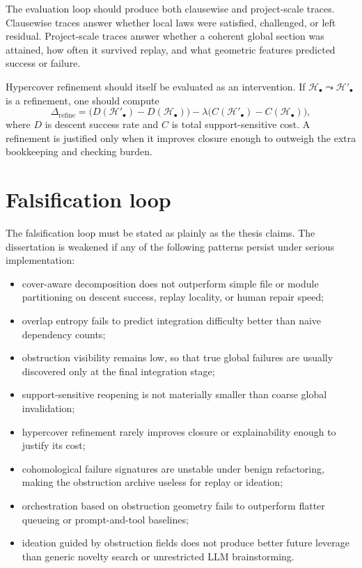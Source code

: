 \documentclass[11pt]{report}
\begin{document}
The evaluation loop should produce both clausewise and project-scale traces. Clausewise traces answer whether local laws were satisfied, challenged, or left residual. Project-scale traces answer whether a coherent global section was attained, how often it survived replay, and what geometric features predicted success or failure.

Hypercover refinement should itself be evaluated as an intervention. If $\mathcal{H}_\bullet \leadsto \mathcal{H}'_\bullet$ is a refinement, one should compute
\[
\Delta_{\mathrm{refine}}
=
\bigl(D(\mathcal{H}'_\bullet)-D(\mathcal{H}_\bullet)\bigr)
-
\lambda\bigl(C(\mathcal{H}'_\bullet)-C(\mathcal{H}_\bullet)\bigr),
\]
where $D$ is descent success rate and $C$ is total support-sensitive cost. A refinement is justified only when it improves closure enough to outweigh the extra bookkeeping and checking burden.

\section{Falsification loop}
The falsification loop must be stated as plainly as the thesis claims. The dissertation is weakened if any of the following patterns persist under serious implementation:
\begin{itemize}
\item cover-aware decomposition does not outperform simple file or module partitioning on descent success, replay locality, or human repair speed;
\item overlap entropy fails to predict integration difficulty better than naive dependency counts;
\item obstruction visibility remains low, so that true global failures are usually discovered only at the final integration stage;
\item support-sensitive reopening is not materially smaller than coarse global invalidation;
\item hypercover refinement rarely improves closure or explainability enough to justify its cost;
\item cohomological failure signatures are unstable under benign refactoring, making the obstruction archive useless for replay or ideation;
\item orchestration based on obstruction geometry fails to outperform flatter queueing or prompt-and-tool baselines;
\item ideation guided by obstruction fields does not produce better future leverage than generic novelty search or unrestricted LLM brainstorming.
\end{itemize}
\end{document}
